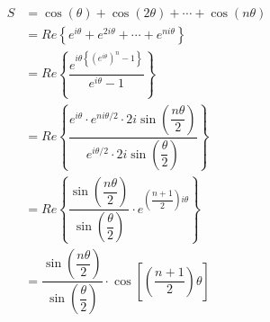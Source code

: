 \addtolength{\jot}{3ex}
\begin{align*}
S &= \cos(\theta) + \cos(2\theta) + \cdots + \cos(n\theta)\\
  &= Re\left\{e^{i\theta} + e^{2i\theta}+ \cdots + e^{ni\theta} \right\}\\
  &= Re\left\{\dfrac{e^{i\theta\left\{ \left(e^{i\theta}\right)^n -1\right\}}}{e^{i\theta}-1}\right\}\\
  &= Re\left\{ \dfrac{e^{i\theta}\cdot e^{ni\theta/2}\cdot 2i\sin\left(\dfrac{n\theta}{2}\right)}{e^{i\theta/2}\cdot 2i\sin\left(\dfrac{\theta}{2}\right)} \right\}\\
  &= Re\left\{ \dfrac{\sin\left(\dfrac{n\theta}{2}\right)}{\sin\left(\dfrac{\theta}{2}\right)} \cdot e^{\left(\dfrac{n+1}{2}\right) i\theta} \right\}\\
  &= \dfrac{\sin\left(\dfrac{n\theta}{2}\right)}{\sin\left(\dfrac{\theta}{2}\right)} \cdot \cos{\left[\left(\dfrac{n+1}{2}\right) \theta \right]}
\end{align*}
